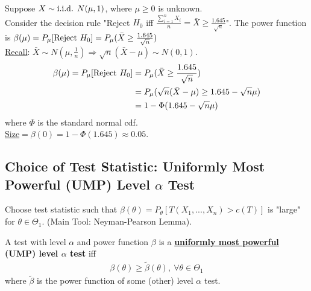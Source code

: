 \documentclass[11pt]{elegantbook}
\begin{document}
\begin{example}
    Suppose $X\sim \textnormal{i.i.d. } N(\mu,1)$, where $\mu\geq 0$ is unknown.\\
    Consider the decision rule "Reject $H_0$ iff $\frac{\sum_{i=1}^n X_i}{n}=\bar{X}\geq \frac{1.645}{\sqrt{n}}$". The power function is $\beta(\mu)=P_\mu[\textnormal{Reject $H_0$}]=P_\mu(\bar{X}\geq\frac{1.645}{\sqrt{n}})$\\
    \underline{Recall}: $\bar{X}\sim N(\mu,\frac{1}{n}) \Rightarrow \sqrt{n}(\bar{X}-\mu)\sim N(0,1)$.
    \begin{equation}
        \begin{aligned}
            \beta(\mu)=P_\mu[\textnormal{Reject $H_0$}]&=P_\mu(\bar{X}\geq\frac{1.645}{\sqrt{n}})\\
            &=P_\mu(\sqrt{n}(\bar{X}-\mu)\geq 1.645-\sqrt{n}\mu)\\
            &=1-\Phi(1.645-\sqrt{n}\mu)
        \end{aligned}
        \nonumber
    \end{equation}
    where $\Phi$ is the standard normal cdf.\\
    \underline{Size}$=\beta(0)=1-\Phi(1.645)\approx 0.05$.
\end{example}

\subsection{Choice of Test Statistic: Uniformly Most Powerful (UMP) Level $\alpha$ Test}
Choose test statistic such that $\beta(\theta)=P_\theta[T(X_1,...,X_n)>c(T)]$ is "large" for $\theta\in\Theta_1$. (Main Tool: Neyman-Pearson Lemma).

\begin{definition}
    \normalfont
    A test with level $\alpha$ and power function $\beta$ is a \textbf{\underline{uniformly most powerful} (UMP) level $\alpha$ test} iff
    \begin{equation}
        \begin{aligned}
            \beta(\theta)\geq \tilde{\beta}(\theta),\ \forall \theta\in\Theta_1
        \end{aligned}
        \nonumber
    \end{equation}
    where $\tilde{\beta}$ is the power function of some (other) level $\alpha$ test.
\end{definition}
\end{document}
